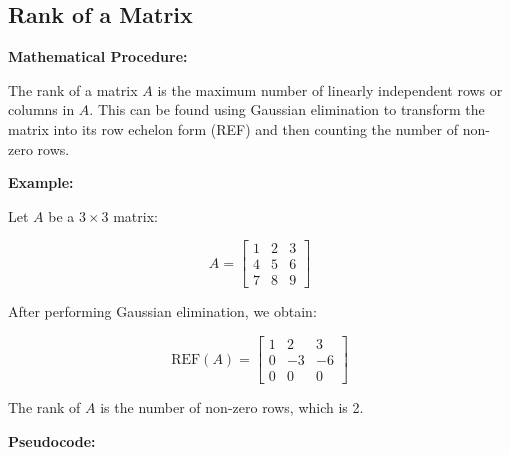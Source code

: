 \documentclass[
  letterpaper,
  DIV=11,
  numbers=noendperiod]{scrreprt}
\theoremstyle{plain}
\theoremstyle{definition}
\theoremstyle{remark}
\begin{document}
\subsection{Rank of a Matrix}\label{rank-of-a-matrix}

\textbf{Mathematical Procedure:}

The rank of a matrix \(A\) is the maximum number of linearly independent
rows or columns in \(A\). This can be found using Gaussian elimination
to transform the matrix into its row echelon form (REF) and then
counting the number of non-zero rows.

\textbf{Example:}

Let \(A\) be a \(3 \times 3\) matrix:

\[A = \begin{bmatrix} 1 & 2 & 3 \\ 4 & 5 & 6 \\ 7 & 8 & 9 \end{bmatrix}\]

After performing Gaussian elimination, we obtain:

\[\text{REF}(A) = \begin{bmatrix} 1 & 2 & 3 \\ 0 & -3 & -6 \\ 0 & 0 & 0 \end{bmatrix}\]

The rank of \(A\) is the number of non-zero rows, which is 2.

\textbf{Pseudocode:}
\end{document}
